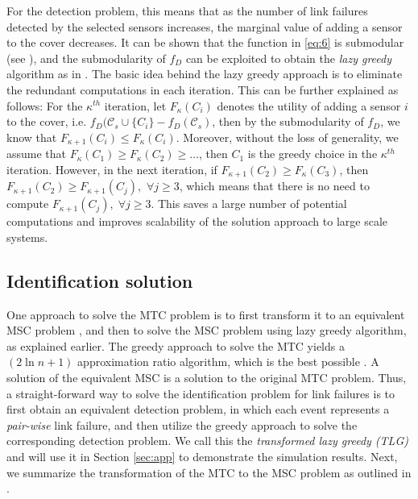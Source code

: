 \documentclass[twocolumn]{autart}
\begin{document}
For the detection problem, this means that as the number of link failures detected by the selected sensors increases, the marginal value of adding a sensor to the cover decreases. It can be shown that the function in \eqref{eq:6} is submodular (see \cite{perelman2015}), and the submodularity of $f_D$ can be exploited to obtain the \textit{lazy greedy} algorithm as in \cite{Minoux1}. The basic idea behind the lazy greedy approach is to eliminate the redundant computations in each iteration. This can be further explained as follows: For the $\kappa^{th}$ iteration, let $F_\kappa(C_i)$ denotes the utility of adding a sensor $i$ to the cover, i.e. $f_D(\mathcal{C}_s\cup\{C_i\} - f_D(\mathcal{C}_s)$, then by the submodularity of $f_D$, we know that $F_{\kappa+1}(C_i)\le F_\kappa(C_i)$. Moreover, without the loss of generality, we assume that $F_\kappa(C_1)\ge F_\kappa(C_2)\ge\dots$, then $C_1$ is the greedy choice in the $\kappa^{th}$ iteration. However, in the next iteration, if $F_{\kappa+1}(C_2)\ge F_\kappa(C_3)$, then $F_{\kappa+1}(C_2)\ge F_{\kappa+1}(C_j),$ $\forall j\ge 3$, which means that there is no need to compute $F_{\kappa+1}(C_j),\;\forall j\ge 3$. This saves a large number of potential computations and improves scalability of the solution approach to large scale systems.

\subsection{Identification solution} \label{sec:3.2}\vspace{-0.35cm}
One approach to solve the MTC problem is to first transform it to an equivalent MSC problem  \cite{Bontriddr1}, and then to solve the MSC problem using lazy greedy algorithm, as explained earlier. The greedy approach to solve the MTC yields a $(2\ln n + 1)$ approximation ratio algorithm, which is the best possible \cite{Moret1}. A solution of the equivalent MSC is a solution to the original MTC problem. Thus, a straight-forward way to solve the identification problem for link failures is to first obtain an equivalent detection problem, in which each event represents a \textit{pair-wise} link failure, and then utilize the greedy approach to solve the corresponding detection problem. We call this the \textit{transformed lazy greedy (TLG)} and will use it in Section \ref{sec:app} to demonstrate the simulation results.
Next, we summarize the transformation of the MTC to the MSC problem as outlined in \cite{Bontriddr1}.
\end{document}
